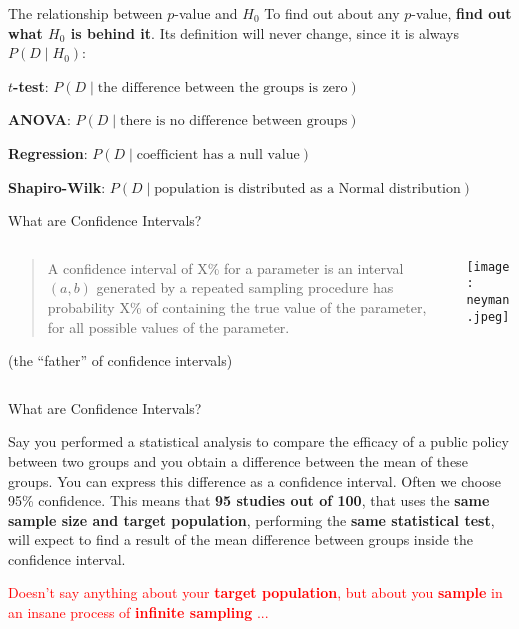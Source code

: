 \begin{frame}{The relationship between $p$-value and $H_0$}
	To find out about any $p$-value, \textbf{find out what $H_0$ is behind it}.
	Its definition will never change, since it is always $P(D \mid H_0)$:
	\begin{vfilleditems}
		\item \textbf{$t$-test}: $P(D \mid \text{the difference between the groups is zero})$
		\item \textbf{ANOVA}: $P(D \mid \text{there is no difference between groups})$
		\item \textbf{Regression}: $P(D \mid \text{coefficient has a null value})$
		\item \textbf{Shapiro-Wilk}: $P(D \mid \text{population is distributed as a Normal distribution})$
	\end{vfilleditems}
\end{frame}

\begin{frame}{What are Confidence Intervals?}
	\begin{columns}
		\begin{column}{0.8\textwidth}
			\begin{defn}
				\begin{quotation}
					A confidence interval of X\% for a parameter is an interval
					$(a, b)$ generated by a repeated sampling procedure
					has probability X\% of containing the true value of the parameter,
					for all possible values of the parameter.
				\end{quotation}
				\vfill \vfill
				\textcite{neyman1937outline} (the ``father'' of confidence intervals)
			\end{defn}
		\end{column}
		\begin{column}{0.2\textwidth}
			\centering
			\texttt{[image: neyman.jpeg]}
		\end{column}
	\end{columns}
\end{frame}

\begin{frame}{What are Confidence Intervals?}
	\begin{example}
		Say you performed a statistical analysis to compare
		the efficacy of a public policy between two groups and you obtain a
		difference between the mean of these groups.
		You can express this difference as a confidence interval.
		Often we choose 95\% confidence.
		This means that \textbf{95 studies out of 100},
		that uses the \textbf{same sample size and target population},
		performing the \textbf{same statistical test},
		will expect to find a result of the mean difference between groups
		inside the confidence interval.
	\end{example}
	\footnotesize \textcolor{red}{Doesn't say anything about your \textbf{target population},
		but about you \textbf{sample} in an insane process of \textbf{infinite sampling} ...}
\end{frame}

